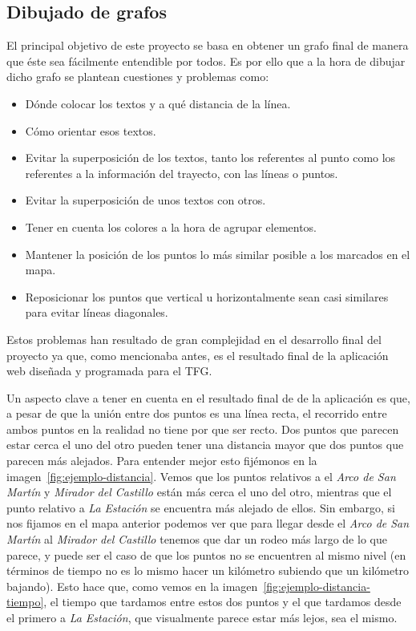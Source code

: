 


\subsection{Dibujado de grafos}\label{sub:dibujar-grafo-svg}
El principal objetivo de este proyecto se basa en obtener un grafo final de manera que éste sea fácilmente entendible por todos. Es por ello que a la hora de dibujar dicho grafo se plantean cuestiones y problemas como:
\begin{itemize}
	\item Dónde colocar los textos y a qué distancia de la línea.
	\item Cómo orientar esos textos.
	\item Evitar la superposición de los textos, tanto los referentes al punto como los referentes a la información del trayecto, con las líneas o puntos.
	\item Evitar la superposición de unos textos con otros.
	\item Tener en cuenta los colores a la hora de agrupar elementos.
	\item Mantener la posición de los puntos lo más similar posible a los marcados en el mapa.
	\item Reposicionar los puntos que vertical u horizontalmente sean casi similares para evitar líneas diagonales.
\end{itemize}

Estos problemas han resultado de gran complejidad en el desarrollo final del proyecto ya que, como mencionaba antes, es el resultado final de la aplicación web diseñada y programada para el TFG.

Un aspecto clave a tener en cuenta en el resultado final de de la aplicación es que, a pesar de que la unión entre dos puntos es una línea recta, el recorrido entre ambos puntos en la realidad no tiene por que ser recto. Dos puntos que parecen estar cerca el uno del otro pueden tener una distancia mayor que dos puntos que parecen más alejados. Para entender mejor esto fijémonos en la imagen~\ref{fig:ejemplo-distancia}. Vemos que los puntos relativos a el \textit{Arco de San Martín} y \textit{Mirador del Castillo} están más cerca el uno del otro, mientras que el punto relativo a \textit{La Estación} se encuentra más alejado de ellos.
Sin embargo, si nos fijamos en el mapa anterior podemos ver que para llegar desde el \textit{Arco de San Martín} al \textit{Mirador del Castillo} tenemos que dar un rodeo más largo de lo que parece, y puede ser el caso de que los puntos no se encuentren al mismo nivel (en términos de tiempo no es lo mismo hacer un kilómetro subiendo que un kilómetro bajando). Esto hace que, como vemos en la imagen~\ref{fig:ejemplo-distancia-tiempo}, el tiempo que tardamos entre estos dos puntos y el que tardamos desde el primero a \textit{La Estación}, que visualmente parece estar más lejos, sea el mismo.

